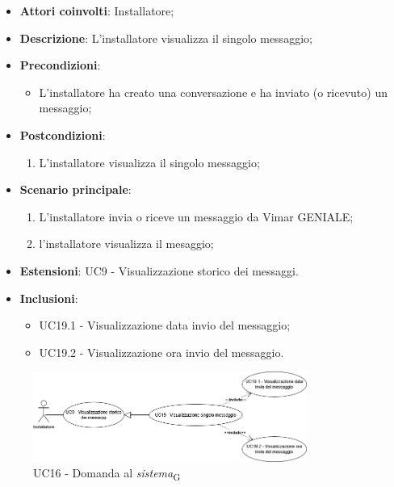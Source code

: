 \begin{itemize}
    \item \textbf{Attori coinvolti}: Installatore;
    \item \textbf{Descrizione}: L'installatore visualizza il singolo messaggio;
    \item \textbf{Precondizioni}: 
        \begin{itemize}
            \item L'installatore ha creato una conversazione e ha inviato (o ricevuto) un messaggio;
        \end{itemize}
    \item \textbf{Postcondizioni}: 
    \begin{enumerate}
        \item L'installatore visualizza il singolo messaggio;
    \end{enumerate}
    \item \textbf{Scenario principale}:
    \begin{enumerate}
        \item L'installatore invia o riceve un messaggio da Vimar GENIALE;
        \item l'installatore visualizza il mesaggio;
    \end{enumerate}
    \item \textbf{Estensioni}: UC9 - Visualizzazione storico dei messaggi.
    \item \textbf{Inclusioni}: 
    \begin{itemize}
        \item UC19.1 - Visualizzazione data invio del messaggio;
        \item UC19.2 - Visualizzazione ora invio del messaggio.
    \end{itemize}
\end{itemize}
\begin{figure}[H]
\centering
\includegraphics[width=0.8\textwidth]{contents/casi_duso/png/UC19.png}
\caption{UC16 - Domanda al \textit{sistema}\textsubscript{G}}
\end{figure}

